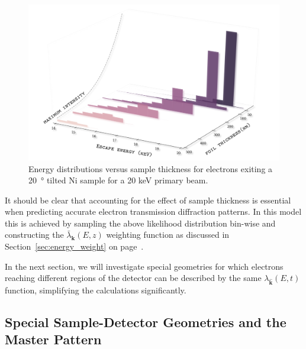 \begin{figure}[ht]
\centering
\includegraphics[width=5in]{Figures/TKD_escapeE.png}
\caption[Energy distributions versus sample thickness.]{Energy distributions versus sample thickness for electrons exiting a \SI{20}{\degree}  tilted Ni sample for a 20 keV primary beam.   }
\label{fig:TKDescapeE}
\end{figure}



It should be clear that accounting for the effect of sample thickness is essential when predicting accurate electron transmission diffraction patterns. In this model this is achieved by sampling the above likelihood distribution bin-wise and constructing the $\bar{\lambda}_{\mathbf{k}}(E,z)$ weighting function as discussed in Section~\ref{sec:energy_weight} on page~\pageref{sec:energy_weight}.

In the next section, we will investigate special geometries for which electrons reaching different regions of the detector can be described by the same $\lambda_{\hat{\mathbf{k}}}(E,t)$ function, simplifying the calculations significantly. 



%
\subsection{Special Sample-Detector Geometries and the Master Pattern}
\label{sec:geom}



